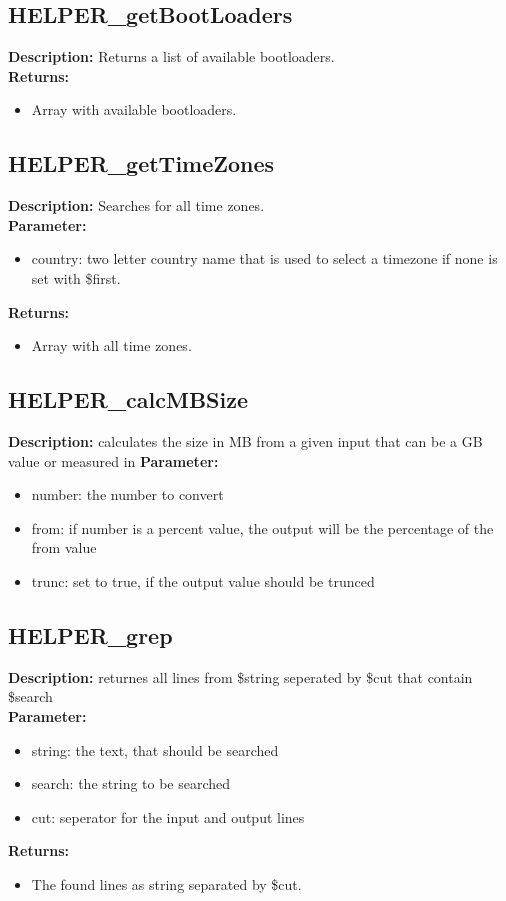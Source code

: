 \subsection{HELPER\_getBootLoaders}
\textbf{Description:} Returns a list of available bootloaders.\\
\textbf{Returns:}
\begin{itemize}
\item Array with available bootloaders.
\end{itemize}

\subsection{HELPER\_getTimeZones}
\textbf{Description:} Searches for all time zones.\\
\textbf{Parameter:}
\begin{itemize}
\item country: two letter country name that is used to select a timezone if none is set with \$first.
\end{itemize}
\textbf{Returns:}
\begin{itemize}
\item Array with all time zones.
\end{itemize}

\subsection{HELPER\_calcMBSize}
\textbf{Description:} calculates the size in MB from a given input that can be a GB value or measured in %
\textbf{Parameter:}
\begin{itemize}
\item number: the number to convert
\item from: if number is a percent value, the output will be the percentage of the from value
\item trunc: set to true, if the output value should be trunced
\end{itemize}

\subsection{HELPER\_grep}
\textbf{Description:} returnes all lines from \$string seperated by \$cut that contain \$search\\
\textbf{Parameter:}
\begin{itemize}
\item string: the text, that should be searched
\item search: the string to be searched
\item cut: seperator for the input and output lines
\end{itemize}
\textbf{Returns:}
\begin{itemize}
\item The found lines as string separated by \$cut.
\end{itemize}


